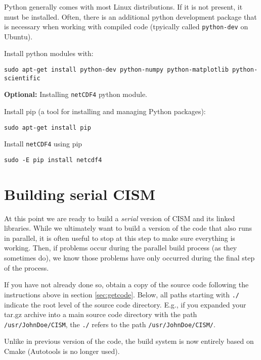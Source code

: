 \begin{mdframed}[style=ubuntu] %
Python generally comes with most Linux distributions.  If it is not present, it must be installed.
Often, there is an additional python development package that is necessary
when working with compiled code (tpyically called \texttt{python-dev} on Ubuntu).

Install python modules with:

\texttt{sudo apt-get install python-dev python-numpy python-matplotlib python-scientific}

\textbf{Optional:} Installing \texttt{netCDF4} python module.

Install pip (a tool for installing and managing Python packages):

\texttt{sudo apt-get install pip}

Install \texttt{netCDF4} using pip

\texttt{sudo -E pip install netcdf4}
\end{mdframed}                 %



\section{Building serial CISM}
\label{serial-build}
At this point we are ready to build a \textit{serial} version of CISM and its linked libraries. While we ultimately want to build a 
version of the code that also runs in parallel, it is often useful to stop at this step to make sure everything is working. Then, if 
problems occur during the parallel build process (as they sometimes do), we know those problems have only occurred during 
the final step of the process.

If you have not already done so, obtain a copy of the source code following the instructions above in section \ref{sec:getcode}. Below, all 
paths starting with \texttt{./} indicate the root level of the source code directory. E.g., if you expanded your tar.gz archive into a main source code 
directory with the path \texttt{/usr/JohnDoe/CISM}, the \texttt{./} refers to the path \texttt{/usr/JohnDoe/CISM/}.  

Unlike in previous version of the code, the build system is now entirely based on Cmake 
(Autotools is no longer used). 

